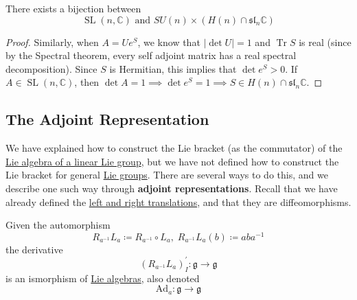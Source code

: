 \documentclass{article}
\DeclareMathOperator{\Tr}{Tr}
\DeclareMathOperator{\SL}{SL}
\newcounter{theorem}[section]
\begin{document}
    \begin{corollary}
      \label{thm:polar-decomposition-of-slnc}
      There exists a bijection between 
      \begin{equation}
        \SL(n, \mathbb{C}) \text{ and } SU(n) \times (H(n) \cap \mathfrak{sl}_n \mathbb{C})
      \end{equation}
    \end{corollary}
    \begin{proof}
      Similarly, when $A = U e^S$, we know that $|\det{U}| = 1$ and $\Tr{S}$ is real (since by the Spectral theorem, every self adjoint matrix has a real spectral decomposition). Since $S$ is Hermitian, this implies that $\det{e^S} > 0$. If $A \in \SL(n, \mathbb{C})$, then $\det{A} = 1 \implies \det{e^S} = 1 \implies S \in H(n) \cap \mathfrak{sl}_n \mathbb{C}$. 
    \end{proof}


  \subsection{The Adjoint Representation}

    We have explained how to construct the Lie bracket (as the commutator) of the \hyperref[thm:lie-algebra-of-a-linear-lie-group]{Lie algebra of a linear Lie group}, but we have not defined how to construct the Lie bracket for general \hyperref[def:lie-group]{Lie groups}. There are several ways to do this, and we describe one such way through \textbf{adjoint representations}. Recall that we have already defined the \hyperref[def:left-and-right-translation]{left and right translations}, and that they are diffeomorphisms. 

    Given the automorphism
    \begin{equation}
      R_{a^{-1}} L_a \coloneqq R_{a^{-1}} \circ L_a, \; R_{a^{-1}} L_a (b) \coloneqq a b a^{-1}
    \end{equation}
    the derivative
    \begin{equation}
      (R_{a^{-1}} L_a)^\prime_I: \mathfrak{g} \rightarrow \mathfrak{g}
    \end{equation}
    is an ismorphism of \hyperref[def:lie-algebra]{Lie algebras}, also denoted 
    \begin{equation}
      \text{Ad}_a: \mathfrak{g} \rightarrow \mathfrak{g}
    \end{equation}
\end{document}
